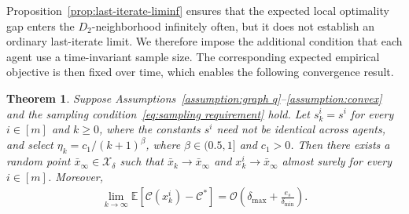\documentclass[twocolumn]{autart}    %
\newcommand{\order}[1]{\mathcal{O}\left(#1\right)}
\newcommand{\brk}[1]{\left[#1\right]}
\newtheorem{theorem}{Theorem}
\newcommand{\1}{\mathbf{1}}
\begin{document}
Proposition~\ref{prop:last-iterate-liminf} ensures that the expected local optimality gap enters the $D_2$-neighborhood infinitely often, but it does not establish an ordinary last-iterate limit. 
We therefore impose the additional condition that each agent use a time-invariant sample size. 
The corresponding expected empirical objective is then fixed over time, which enables the following convergence result.

\begin{theorem}\label{theorem:last-iterate}
Suppose Assumptions~\ref{assumption:graph q}--\ref{assumption:convex} and the sampling condition~\eqref{eq:sampling requirement} hold. Let $s_k^i=s^i$ for every $i\in[m]$ and $k\geq0$, where the constants $s^i$ need not be identical across agents, and select $\eta_k=c_1/(k+1)^\beta$, where $\beta\in(0.5,1]$ and $c_1>0$. Then there exists a random point $\bar x_\infty\in\mathcal X_\delta$ such that $\bar x_k\to\bar x_\infty$ and $x_k^i\to\bar x_\infty$ almost surely for every $i\in[m]$. Moreover,
\begin{align}
 \lim_{k\to\infty}
\mathbb E\brk{\mathcal C(x_k^i)-\mathcal C^\ast}
= \order{\delta_{\max}+\frac{e_s}{\delta_{\min}}}.
\label{eq:last-iterate-limit}
\end{align}
\end{theorem}
\end{document}
